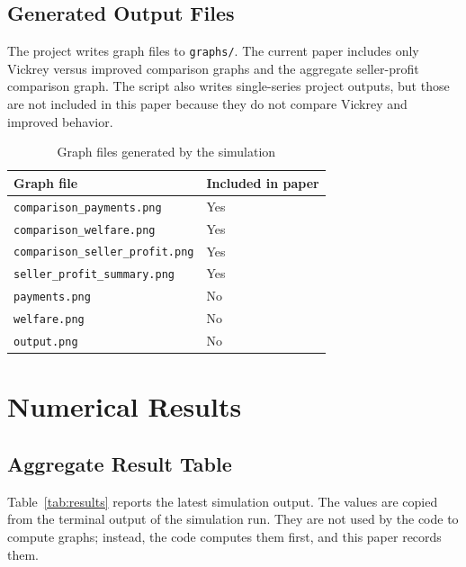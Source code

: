 \documentclass[conference]{IEEEtran}
\begin{document}
\subsection{Generated Output Files}
The project writes graph files to \texttt{graphs/}. The current paper includes only Vickrey versus improved comparison graphs and the aggregate seller-profit comparison graph. The script also writes single-series project outputs, but those are not included in this paper because they do not compare Vickrey and improved behavior.

\begin{table}[htbp]
\caption{Graph files generated by the simulation}
\label{tab:graphs}
\centering
\begin{tabular}{ll}
\toprule
\textbf{Graph file} & \textbf{Included in paper} \\
\midrule
\texttt{comparison\_payments.png} & Yes \\
\texttt{comparison\_welfare.png} & Yes \\
\texttt{comparison\_seller\_profit.png} & Yes \\
\texttt{seller\_profit\_summary.png} & Yes \\
\texttt{payments.png} & No \\
\texttt{welfare.png} & No \\
\texttt{output.png} & No \\
\bottomrule
\end{tabular}
\end{table}

\section{Numerical Results}
\subsection{Aggregate Result Table}
Table~\ref{tab:results} reports the latest simulation output. The values are copied from the terminal output of the simulation run. They are not used by the code to compute graphs; instead, the code computes them first, and this paper records them.
\end{document}
